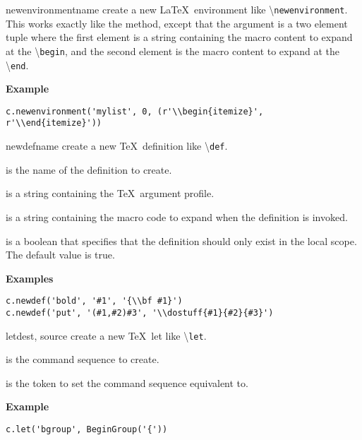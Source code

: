\documentclass{manual}
\newcommand{\macro}[1]{\textbackslash\texttt{#1}}
\begin{document}
\begin{methoddesc}[Context]{newenvironment}{name}
create a new \LaTeX\ environment like \macro{newenvironment}.  This works
exactly like the  method, except that the 
 argument is a two element tuple where the first element
is a string containing the macro content to expand at the \macro{begin},
and the second element is the macro content to expand at the \macro{end}.

\textbf{Example}
\begin{verbatim}
c.newenvironment('mylist', 0, (r'\\begin{itemize}', r'\\end{itemize}'))
\end{verbatim}
\end{methoddesc}

\begin{methoddesc}[Context]{newdef}{name}
create a new \TeX\ definition like \macro{def}.

 is the name of the definition to create.

 is a string containing the \TeX\ argument profile.

 is a string containing the macro code to expand when the
definition is invoked.

 is a boolean that specifies that the definition should only
exist in the local scope.  The default value is true.

\textbf{Examples}
\begin{verbatim}
c.newdef('bold', '#1', '{\\bf #1}')
c.newdef('put', '(#1,#2)#3', '\\dostuff{#1}{#2}{#3}')
\end{verbatim}
\end{methoddesc}

\begin{methoddesc}[Context]{let}{dest, source}
create a new \TeX\ let like \macro{let}.

 is the command sequence to create.

 is the token to set the command sequence equivalent to.

\textbf{Example}
\begin{verbatim}
c.let('bgroup', BeginGroup('{'))
\end{verbatim}
\end{methoddesc}
\end{document}

